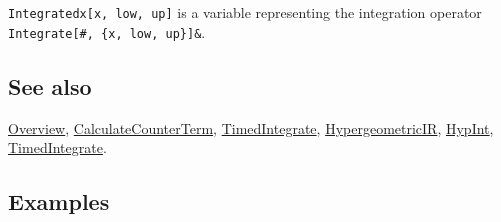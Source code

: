 \documentclass[../FeynCalcManual.tex]{subfiles}
\begin{document}
\texttt{Integratedx[\allowbreak{}x,\ \allowbreak{}low,\ \allowbreak{}up]}
is a variable representing the integration operator
\texttt{Integrate[\allowbreak{}\#{}\allowbreak{},\ \allowbreak{}\{\allowbreak{}x,\ \allowbreak{}low,\ \allowbreak{}up\}]\&{}\allowbreak{}}.

\subsection{See also}

\hyperlink{toc}{Overview},
\hyperlink{calculatecounterterm}{CalculateCounterTerm},
\hyperlink{timedintegrate}{TimedIntegrate},
\hyperlink{hypergeometricir}{HypergeometricIR},
\hyperlink{hypint}{HypInt}, \hyperlink{timedintegrate}{TimedIntegrate}.

\subsection{Examples}
\end{document}
